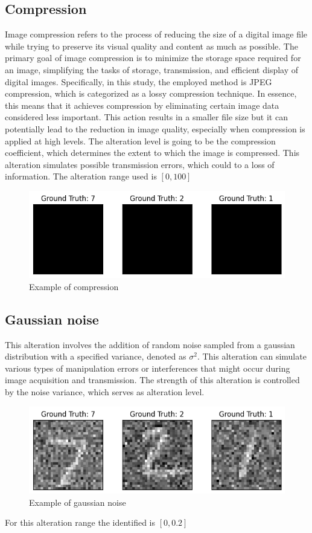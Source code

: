 \subsection{Compression}

Image compression refers to the process of reducing the size of a digital image file while trying to preserve its visual quality and content as much as possible. The primary goal of image compression is to minimize the storage space required for an image, simplifying the tasks of storage, transmission, and efficient display of digital images. Specifically, in this study, the employed method is JPEG compression, which is categorized as a lossy compression technique. In essence, this means that it achieves compression by eliminating certain image data considered less important. This action results in a smaller file size but it can potentially lead to the reduction in image quality, especially when compression is applied at high levels. The alteration level is going to be the compression coefficient, which determines the extent to which the image is compressed. This alteration simulates possible transmission errors, which could to a loss of information. The alteration range used is $[0,100]$

\begin{figure}[h]
	\centering
	\includegraphics[width=0.6\linewidth]{ImageFiles/Alterations/Compression}
	\caption{Example of compression}
	\label{fig:Compression}
\end{figure}

\subsection{Gaussian noise}

This alteration involves the addition of random noise sampled from a gaussian distribution with a specified variance, denoted as $\sigma^2$. This alteration can simulate various types of manipulation errors or interferences that might occur during image acquisition and transmission. The strength of this alteration is controlled by the noise variance, which serves as alteration level.

\begin{figure}[h]
	\centering
	\includegraphics[width=0.6\linewidth]{ImageFiles/Alterations/GN}
	\caption{Example of gaussian noise}
	\label{fig:GN}
\end{figure}

For this alteration range the identified is $[0,0.2]$